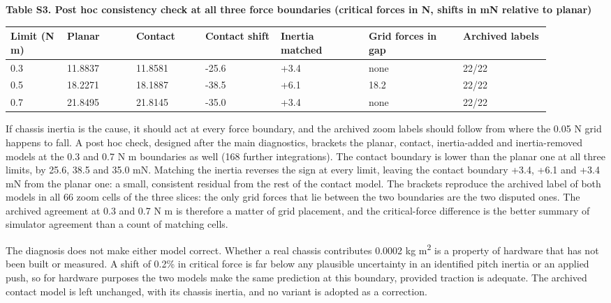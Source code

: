 \documentclass[11pt,a4paper]{article}
\begin{document}
\textbf{Table S3. Post hoc consistency check at all three force boundaries (critical forces in N, shifts in mN relative to planar)}
\begin{longtable}{p{0.099\linewidth}p{0.117\linewidth}p{0.117\linewidth}p{0.126\linewidth}p{0.144\linewidth}p{0.153\linewidth}p{0.144\linewidth}}
\toprule
Limit (N m) & Planar & Contact & Contact shift & Inertia matched & Grid forces in gap & Archived labels \\ \midrule \endhead
0.3 & 11.8837 & 11.8581 & -25.6 & +3.4 & none & 22/22 \\
0.5 & 18.2271 & 18.1887 & -38.5 & +6.1 & 18.2 & 22/22 \\
0.7 & 21.8495 & 21.8145 & -35.0 & +3.4 & none & 22/22 \\
\bottomrule
\end{longtable}
If chassis inertia is the cause, it should act at every force boundary, and the archived zoom labels should follow from where the 0.05 N grid happens to fall. A post hoc check, designed after the main diagnostics, brackets the planar, contact, inertia-added and inertia-removed models at the 0.3 and 0.7 N m boundaries as well (168 further integrations). The contact boundary is lower than the planar one at all three limits, by 25.6, 38.5 and 35.0 mN. Matching the inertia reverses the sign at every limit, leaving the contact boundary +3.4, +6.1 and +3.4 mN from the planar one: a small, consistent residual from the rest of the contact model. The brackets reproduce the archived label of both models in all 66 zoom cells of the three slices: the only grid forces that lie between the two boundaries are the two disputed ones. The archived agreement at 0.3 and 0.7 N m is therefore a matter of grid placement, and the critical-force difference is the better summary of simulator agreement than a count of matching cells.

The diagnosis does not make either model correct. Whether a real chassis contributes 0.0002 kg m\textsuperscript{2} is a property of hardware that has not been built or measured. A shift of 0.2\% in critical force is far below any plausible uncertainty in an identified pitch inertia or an applied push, so for hardware purposes the two models make the same prediction at this boundary, provided traction is adequate. The archived contact model is left unchanged, with its chassis inertia, and no variant is adopted as a correction.

\clearpage
\end{document}

